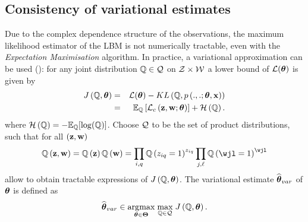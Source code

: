 \documentclass[bj]{imsart}
\numberwithin{equation}{section}
\theoremstyle{plain}
\theoremstyle{remark}
\begin{document}
\subsection{Consistency of variational estimates}
Due to the complex dependence structure of the observations, the maximum likelihood estimator of the LBM is not numerically tractable, even  with the \textit{Expectation Maximisation} algorithm. In practice, a variational approximation can be used (\cite[see for example][]{govaert2003}): for any joint distribution $\mathbb{Q}\in\mathcal{Q}$ on $\mathcal{Z}\times\mathcal{W}$ a lower bound of $\mathcal{L}(\boldsymbol{\theta})$ is given by
\begin{eqnarray*}
\Jvar\left(\setQ,\btheta\right)&=&\mcL(\btheta)-KL\left(\setQ,\prob\left(., . ; \btheta,\bx\right)\right)\\
                            &=&\Esp_{\setQ}\left[\Lc\left(\bz,\bw;\btheta\right)\right]+\mcH\left(\setQ\right).
\end{eqnarray*}
where $\mathcal{H}\left(\mathbb{Q}\right)=-\mathbb{E}_{\mathbb{Q}}[\log(\mathbb{Q})]$.
Choose $\mathcal{Q}$  to be the set of product distributions, such that for all $\left(\mathbf{z},\mathbf{w}\right)$
\[\setQ\left(\bz,\bw\right)=\setQ\left(\bz\right)\setQ\left(\bw\right)=\prod_{\ii,\kk}\setQ\left(\zik=1\right)^{\zik} \prod_{\jj,\el}\setQ\left(\wjl=1\right)^{\wjl}\]
allow to obtain tractable expressions of $J\left(\mathbb{Q},\boldsymbol{\theta}\right)$. The variational estimate $\widehat{\boldsymbol{\theta}}_{var}$ of $\boldsymbol{\theta}$ is defined as
\[\widehat{\boldsymbol{\theta}}_{var}\in\underset{\boldsymbol{\theta}\in\boldsymbol{\Theta}}{\arg\!\max}\;\underset{\mathbb{Q}\in\mathcal{Q}}{\max}\;J\left(\mathbb{Q},\boldsymbol{\theta}\right).\]
\end{document}
